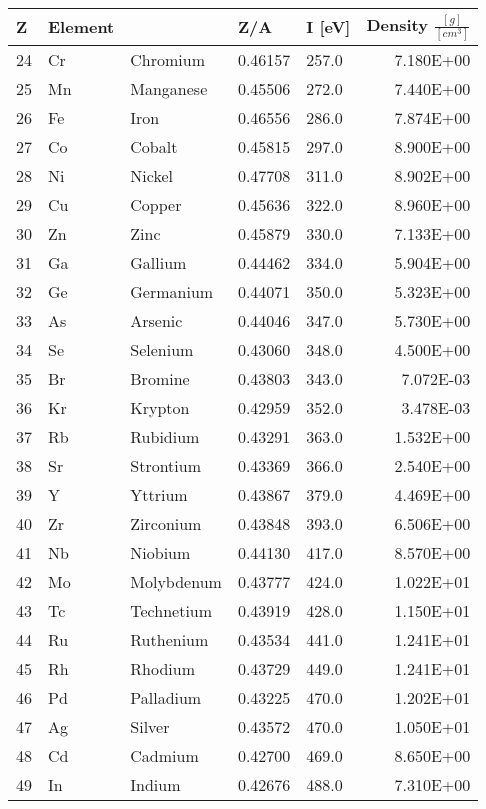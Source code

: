\begin{tabular}{l|l|l|l|l|r}

Z & Element &   & Z/A & I [eV] & Density $\frac{[g]}{[cm^3]}$ \\
\hline
24 &	Cr &	Chromium &	0.46157 &	257.0 &	7.180E+00 \\
25 &	Mn &	Manganese &	0.45506 &	272.0 &	7.440E+00 \\
26 &	Fe &	Iron &	0.46556 &	286.0 &	7.874E+00 \\
27 &	Co &	Cobalt &	0.45815 &	297.0 &	8.900E+00 \\
28 &	Ni &	Nickel &	0.47708 &	311.0 &	8.902E+00 \\
29 &	Cu &	Copper &	0.45636 &	322.0 &	8.960E+00 \\
30 &	Zn &	Zinc &	0.45879 &	330.0 &	7.133E+00 \\
31 &	Ga &	Gallium &	0.44462 &	334.0 &	5.904E+00 \\
32 &	Ge &	Germanium &	0.44071 &	350.0 &	5.323E+00 \\
33 &	As &	Arsenic &	0.44046 &	347.0 &	5.730E+00 \\
34 &	Se &	Selenium &	0.43060 &	348.0 &	4.500E+00 \\
35 &	Br &	Bromine &	0.43803	& 343.0 &	7.072E-03 \\
36 &	Kr &	Krypton	& 0.42959	& 352.0 &	3.478E-03 \\
37 &	Rb &	Rubidium &	0.43291	& 363.0 &	1.532E+00 \\
38 &	Sr &	Strontium &	0.43369	& 366.0 &	2.540E+00 \\
39 &	Y  &	Yttrium &	0.43867	& 379.0 &	4.469E+00 \\
40 &	Zr &	Zirconium &	0.43848	& 393.0 &	6.506E+00 \\
41 &	Nb &	Niobium &	0.44130	& 417.0 &	8.570E+00 \\
42 &	Mo &	Molybdenum &	0.43777 &	424.0 &	1.022E+01 \\
43 &	Tc &	Technetium &	0.43919 &	428.0 &	1.150E+01 \\
44 &	Ru &	Ruthenium  &	0.43534 &	441.0 &	1.241E+01 \\
45 &	Rh &	Rhodium &	0.43729 &	449.0 &	1.241E+01 \\
46 &	Pd &	Palladium & 	0.43225 &	470.0 &	1.202E+01 \\
47 &	Ag &	Silver  &	0.43572 &	470.0 &	1.050E+01 \\
48 &	Cd &	Cadmium &	0.42700 &	469.0 &	8.650E+00 \\
49 &	In &	Indium  &	0.42676 &	488.0 &	7.310E+00 \\

\end{tabular}
